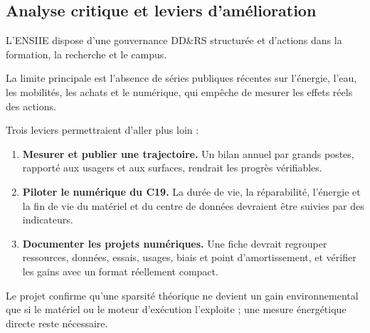 \subsection{Analyse critique et leviers d'amélioration}
\label{ssec:ddrs_critique}

L'ENSIIE dispose d'une gouvernance DD\&RS structurée et d'actions dans la
formation, la recherche et le campus.

La limite principale est l'absence de séries publiques récentes sur l'énergie,
l'eau, les mobilités, les achats et le numérique, qui empêche de mesurer les
effets réels des actions.

Trois leviers permettraient d'aller plus loin :

\begin{enumerate}
    \item \textbf{Mesurer et publier une trajectoire.} Un bilan annuel par
    grands postes, rapporté aux usagers et aux surfaces, rendrait les progrès
    vérifiables.

    \item \textbf{Piloter le numérique du C19.} La durée de vie, la réparabilité,
    l'énergie et la fin de vie du matériel et du centre de données devraient être
    suivies par des indicateurs.

    \item \textbf{Documenter les projets numériques.} Une fiche devrait regrouper
    ressources, données, essais, usages, biais et point d'amortissement, et
    vérifier les gains avec un format réellement compact.

\end{enumerate}

Le projet confirme qu'une sparsité théorique ne devient un gain environnemental
que si le matériel ou le moteur d'exécution l'exploite ; une mesure énergétique
directe reste nécessaire.

